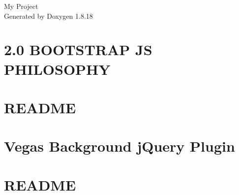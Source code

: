 \let\mypdfximage\pdfximage\def\pdfximage{\immediate\mypdfximage}\documentclass[twoside]{book}
\newcommand{\+}{\discretionary{\mbox{\scriptsize$\hookleftarrow$}}{}{}}
\newcommand{\clearemptydoublepage}{%
  \newpage{\pagestyle{empty}\cleardoublepage}%
}
\begin{document}
\hypersetup{pageanchor=false,
             bookmarksnumbered=true,
             pdfencoding=unicode
            }
\begin{titlepage}
\vspace*{7cm}
\begin{center}%
{\Large My Project }\\
\vspace*{1cm}
{\large Generated by Doxygen 1.8.18}\\
\end{center}
\end{titlepage}
\clearemptydoublepage
{}
\tableofcontents
\clearemptydoublepage
{}
\hypersetup{pageanchor=true}

\chapter{2.0 B\+O\+O\+T\+S\+T\+R\+AP JS P\+H\+I\+L\+O\+S\+O\+P\+HY}
\label{md__c_1__users__janbl__documents__git_hub__proj_src_view_content_documentation_assets_js__r_e_a_d_m_e}

\chapter{R\+E\+A\+D\+ME}
\label{md__c_1__users__janbl__documents__git_hub__proj_src_view_content_scripts_fontawesome__r_e_a_d_m_e}

\chapter{Vegas Background j\+Query Plugin}
\label{md__c_1__users__janbl__documents__git_hub__proj_src_view_content_scripts_vegas__r_e_a_d_m_e}

\chapter{R\+E\+A\+D\+ME}
\label{md__c_1__users__janbl__documents__git_hub__proj_src_view_content_site_scripts_fontawesome__r_e_a_d_m_e}

\end{document}
